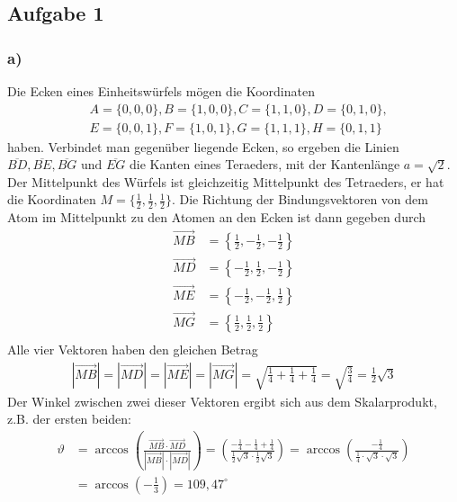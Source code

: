 \documentclass[11pt]{article}
\begin{document}
\subsection*{Aufgabe 1}

\subsubsection*{a)}
Die Ecken eines Einheitswürfels mögen die Koordinaten
\begin{align*}
&A = \{0,0,0\}, B = \{1,0,0\}, C = \{1,1,0\}, D = \{0,1,0\},\\
&E = \{0,0,1\}, F = \{1,0,1\}, G = \{1,1,1\}, H = \{0,1,1\}
\end{align*}
haben. Verbindet man gegenüber liegende Ecken, so ergeben die Linien $\overline{BD}, \overline{BE}, \overline{BG} \text{ und } \overline{EG}$ die Kanten eines Teraeders, mit der Kantenlänge $a = \sqrt{2}$. Der Mittelpunkt des Würfels ist gleichzeitig
Mittelpunkt des Tetraeders, er hat die Koordinaten
$M = \{\frac{1}{2}, \frac{1}{2}, \frac{1}{2}\}$. Die Richtung der Bindungsvektoren
von dem Atom im Mittelpunkt zu den Atomen an den Ecken ist dann gegeben durch
\begin{align*}
\overrightarrow{MB} &= \left\{\frac{1}{2}, -\frac{1}{2}, -\frac{1}{2}\right\}\\
\overrightarrow{MD} &= \left\{-\frac{1}{2}, \frac{1}{2}, -\frac{1}{2}\right\}\\
\overrightarrow{ME} &= \left\{-\frac{1}{2}, -\frac{1}{2}, \frac{1}{2}\right\}\\
\overrightarrow{MG} &= \left\{\frac{1}{2}, \frac{1}{2}, \frac{1}{2}\right\}\\
\end{align*}
Alle vier Vektoren haben den gleichen Betrag
\begin{align*}
\left|\overrightarrow{MB}\right| = \left|\overrightarrow{MD}\right| =
\left|\overrightarrow{ME}\right| = \left|\overrightarrow{MG}\right| =
\sqrt{\frac{1}{4}+\frac{1}{4}+\frac{1}{4}} = \sqrt{\frac{3}{4}} = \frac{1}{2} \sqrt{3}
\end{align*}
Der Winkel zwischen zwei dieser Vektoren ergibt sich aus dem Skalarprodukt, z.B. der ersten beiden:
\begin{align*}
  \vartheta &= \arccos \left(\frac {\overrightarrow{MB} \cdot \overrightarrow{MD}}
  {\left|\overrightarrow{MB}\right| \cdot \left|\overrightarrow{MD}\right|} \right) =
  \left(\frac{-\frac{1}{4}-\frac{1}{4}+\frac{1}{4}}{\frac{1}{2} \sqrt{3} \cdot \frac{1}{2} \sqrt{3}} \right)
    = \arccos \left(\frac{-\frac{1}{4}}{\frac{1}{4} \cdot  \sqrt{3} \cdot \sqrt{3}} \right)
    \\&= \arccos \left( -\frac{1}{3} \right) = 109,47^{\circ}
\end{align*}
\end{document}

